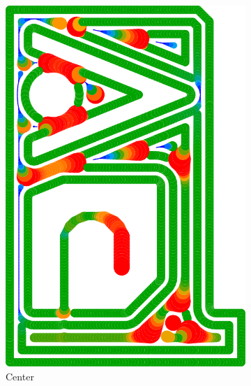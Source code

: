 \begin{figure}
\begin{subfigure}{\figwidth}
\includegraphics[height=\figheight]{sources/validation/gMAT_example/TEST_Center_widths.png}
\caption{Center}\label{TEST_Center_accuracy}
\end{subfigure}
\begin{subfigure}{\figwidth}\centering

\end{subfigure}
\end{figure}
